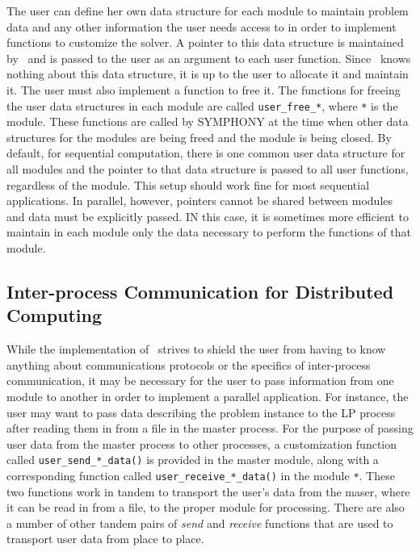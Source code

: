 The user can define her own data structure for each module to maintain problem
data and any other information the user needs access to in order to implement
functions to customize the solver. A pointer to this data structure is
maintained by \BB\ and is passed to the user as an argument to each user
function. Since \BB\ knows nothing about this data structure, it is up to the
user to allocate it and maintain it. The user must also implement a function
to free it. The functions for freeing the user data structures in each module
are called \texttt{user\_free\_*}, where \texttt{*} is the module. These
functions are called by SYMPHONY at the time when other data structures for
the modules are being freed and the module is being closed. By default, for
sequential computation, there is one common user data structure for all
modules and the pointer to that data structure is passed to all user
functions, regardless of the module. This setup should work fine for most
sequential applications. In parallel, however, pointers cannot be shared
between modules and data must be explicitly passed. IN this case, it is
sometimes more efficient to maintain in each module only the data necessary to
perform the functions of that module.

\subsection{Inter-process Communication for Distributed Computing}
\label{communication}
While the implementation of \BB\ strives to shield the user from having to
know anything about communications protocols or the specifics of inter-process
communication, it may be necessary for the user to pass information from one
module to another in order to implement a parallel application. For instance,
the user may want to pass data describing the problem instance to the LP
process after reading them in from a file in the master process. For the
purpose of passing user data from the master process to other processes, a
customization function called
\texttt{user\_send\_*\_data()} is provided in the master module, along with a
corresponding function called \texttt{user\_receive\_*\_data()} in the module
\texttt{*}. These two functions work in tandem to transport the user's data
from the maser, where it can be read in from a file, to the proper module for
processing. There are also a number of other tandem pairs of \emph{send} and
\emph{receive} functions that are used to transport user data from place to
place.

